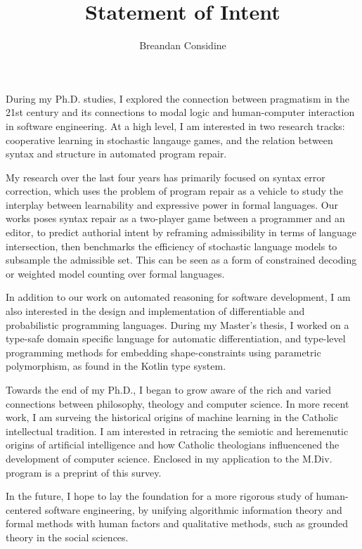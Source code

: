 \documentclass[11pt]{article}
\title{Statement of Intent}
\author{Breandan Considine}
\begin{document}
\maketitle
During my Ph.D. studies, I explored the connection between pragmatism in the 21st century and its connections to modal logic and human-computer interaction in software engineering. At a high level, I am interested in two research tracks: cooperative learning in stochastic langauge games, and the relation between syntax and structure in automated program repair.

My research over the last four years has primarily focused on syntax error correction, which uses the problem of program repair as a vehicle to study the interplay between learnability and expressive power in formal languages. Our works poses syntax repair as a two-player game between a programmer and an editor, to predict authorial intent by reframing admissibility in terms of language intersection, then benchmarks the efficiency of stochastic language models to subsample the admissible set. This can be seen as a form of constrained decoding or weighted model counting over formal languages.


In addition to our work on automated reasoning for software development, I am also interested in the design and implementation of differentiable and probabilistic programming languages. During my Master's thesis, I worked on a type-safe domain specific language for automatic differentiation, and type-level programming methods for embedding shape-constraints using parametric polymorphism, as found in the Kotlin type system.

Towards the end of my Ph.D., I began to grow aware of the rich and varied connections between philosophy, theology and computer science. In more recent work, I am surveing the historical origins of machine learning in the Catholic intellectual tradition. I am interested in retracing the semiotic and heremenutic origins of artificial intelligence and how Catholic theologians influencened the development of computer science. Enclosed in my application to the M.Div. program is a preprint of this survey.

In the future, I hope to lay the foundation for a more rigorous study of human-centered software engineering, by unifying algorithmic information theory and formal methods with human factors and qualitative methods, such as grounded theory in the social sciences.
\end{document}
